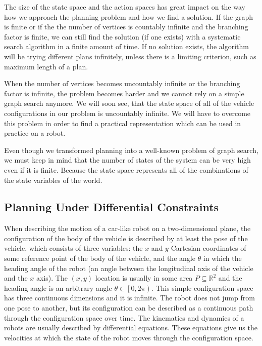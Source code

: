 The size of the state space and the action spaces has great impact on the way how we approach the planning problem and how we find a solution. If the graph is finite or if the the number of vertices is countably infinite and the branching factor is finite, we can still find the solution (if one exists) with a systematic search algorithm in a finite amount of time. If no solution exists, the algorithm will be trying different plans infinitely, unless there is a limiting criterion, such as maximum length of a plan.

When the number of vertices becomes uncountably infinite or the branching factor is infinite, the problem becomes harder and we cannot rely on a simple graph search anymore. We will soon see, that the state space of all of the vehicle configurations in our problem is uncountably infinite. We will have to overcome this problem in order to find a practical representation which can be used in practice on a robot.

Even though we transformed planning into a well-known problem of graph search, we must keep in mind that the number of states of the system can be very high even if it is finite. Because the state space represents all of the combinations of the state variables of the world. 

\subsection{Planning Under Differential Constraints}
\label{sec:planning_under_differential_constraints}

When describing the motion of a car-like robot on a two-dimensional plane, the configuration of the body of the vehicle is described by at least the pose of the vehicle, which consists of three variables: the $x$ and $y$ Cartesian coordinates of some reference point of the body of the vehicle, and the angle $\theta$ in which the heading angle of the robot  (an angle between the longitudinal axis of the vehicle and the $x$ axis). The $(x, y)$ location is usually in some area $P\subseteq\mathbb{R}^2$ and the heading angle is an arbitrary angle $\theta\in\left[0,2\pi\right)$. This simple configuration space has three continuous dimensions and it is infinite. The robot does not jump from one pose to another, but its configuration can be described as a continuous path through the configuration space over time. The kinematics and dynamics of a robots are usually described by differential equations. These equations give us the velocities at which the state of the robot moves through the configuration space.

